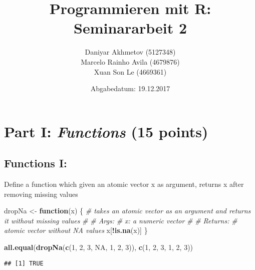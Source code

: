 \documentclass[12,]{article}
\title{Programmieren mit R: Seminararbeit 2}
\author{Daniyar Akhmetov (5127348) \\ Marcelo Rainho Avila (4679876) \\ Xuan Son Le (4669361)}
\date{Abgabedatum: 19.12.2017}
\newenvironment{Shaded}{\begin{snugshade}}{\end{snugshade}}
\newcommand{\KeywordTok}[1]{\textcolor[rgb]{0.13,0.29,0.53}{\textbf{#1}}}
\newcommand{\DecValTok}[1]{\textcolor[rgb]{0.00,0.00,0.81}{#1}}
\newcommand{\StringTok}[1]{\textcolor[rgb]{0.31,0.60,0.02}{#1}}
\newcommand{\CommentTok}[1]{\textcolor[rgb]{0.56,0.35,0.01}{\textit{#1}}}
\newcommand{\OtherTok}[1]{\textcolor[rgb]{0.56,0.35,0.01}{#1}}
\newcommand{\ControlFlowTok}[1]{\textcolor[rgb]{0.13,0.29,0.53}{\textbf{#1}}}
\newcommand{\OperatorTok}[1]{\textcolor[rgb]{0.81,0.36,0.00}{\textbf{#1}}}
\newcommand{\NormalTok}[1]{#1}
\begin{document}
\maketitle

{
\setcounter{tocdepth}{3}
\tableofcontents
}
\newpage

\section{\texorpdfstring{Part I: \emph{Functions} (15
points)}{Part I: Functions (15 points)}}\label{part-i-functions-15-points}

\subsection{Functions I:}\label{functions-i}

Define a function which given an atomic vector x as argument, returns x
after removing missing values

\begin{Shaded}
\begin{Highlighting}[]
\NormalTok{dropNa <-}\StringTok{ }\ControlFlowTok{function}\NormalTok{(x) \{}
  \CommentTok{# takes an atomic vector as an argument and returns it without missing values}
  \CommentTok{#}
  \CommentTok{# Args:}
  \CommentTok{#   x: a numeric vector}
  \CommentTok{#}
  \CommentTok{# Returns:}
  \CommentTok{#   atomic vector without NA values}
\NormalTok{  x[}\OperatorTok{!}\KeywordTok{is.na}\NormalTok{(x)]}
\NormalTok{\}}
\end{Highlighting}
\end{Shaded}

\begin{Shaded}
\begin{Highlighting}[]
\KeywordTok{all.equal}\NormalTok{(}\KeywordTok{dropNa}\NormalTok{(}\KeywordTok{c}\NormalTok{(}\DecValTok{1}\NormalTok{, }\DecValTok{2}\NormalTok{, }\DecValTok{3}\NormalTok{, }\OtherTok{NA}\NormalTok{, }\DecValTok{1}\NormalTok{, }\DecValTok{2}\NormalTok{, }\DecValTok{3}\NormalTok{)), }\KeywordTok{c}\NormalTok{(}\DecValTok{1}\NormalTok{, }\DecValTok{2}\NormalTok{, }\DecValTok{3}\NormalTok{, }\DecValTok{1}\NormalTok{, }\DecValTok{2}\NormalTok{, }\DecValTok{3}\NormalTok{))}
\end{Highlighting}
\end{Shaded}

\begin{verbatim}
## [1] TRUE
\end{verbatim}
\end{document}
